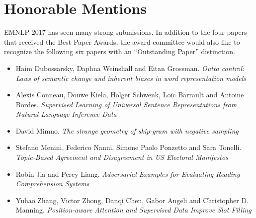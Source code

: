 \clearpage
\section{Honorable Mentions}

EMNLP 2017 has seen many strong submissions. In addition to the four papers that received the Best Paper Awards, the award committee would also like to recognize the following six papers with an ``Outstanding Paper'' distinction.

\begin{itemize}
\item Haim Dubossarsky, Daphna Weinshall and Eitan Grossman. \textit{Outta control: Laws of semantic change and inherent biases in word representation models}
\item Alexis Conneau, Douwe Kiela, Holger Schwenk, Loïc Barrault and Antoine Bordes. \textit{Supervised Learning of Universal Sentence Representations from Natural Language Inference Data}
\item David Mimno. \textit{The strange geometry of skip-gram with negative sampling}
\item Stefano Menini, Federico Nanni, Simone Paolo Ponzetto and Sara Tonelli. \textit{Topic-Based Agreement and Disagreement in US Electoral Manifestos}
\item Robin Jia and Percy Liang. \textit{Adversarial Examples for Evaluating Reading Comprehension Systems}
\item Yuhao Zhang, Victor Zhong, Danqi Chen, Gabor Angeli and Christopher D. Manning. \textit{Position-aware Attention and Supervised Data Improve Slot Filling}
\end{itemize}